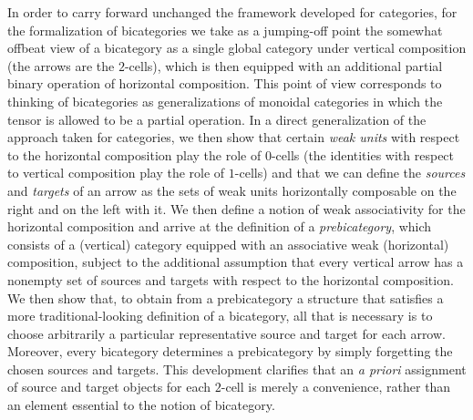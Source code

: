 \documentclass[11pt,notitlepage,a4paper]{report}
\begin{document}
In order to carry forward unchanged the framework developed for categories, for the
formalization of bicategories we take as a jumping-off point the somewhat offbeat view of
a bicategory as a single global category under vertical composition (the arrows are
the $2$-cells), which is then equipped with an additional partial binary operation of
horizontal composition.  This point of view corresponds to thinking of bicategories as
generalizations of monoidal categories in which the tensor is allowed to be a partial
operation.  In a direct generalization of the approach taken for categories,
we then show that certain \emph{weak units} with respect to the horizontal composition play
the role of $0$-cells (the identities with respect to vertical composition play the role
of $1$-cells) and that we can define the \emph{sources} and \emph{targets} of an arrow
as the sets of weak units horizontally composable on the right and on the left with it.
We then define a notion of weak associativity for the horizontal composition and arrive
at the definition of a \emph{prebicategory}, which consists of a (vertical) category equipped
with an associative weak (horizontal) composition, subject to the additional assumption
that every vertical arrow has a nonempty set of sources and targets with respect to
the horizontal composition.
We then show that, to obtain from a prebicategory a structure that satisfies a more
traditional-looking definition of a bicategory, all that is necessary is to choose
arbitrarily a particular representative source and target for each arrow.
Moreover, every bicategory determines a prebicategory by simply forgetting the chosen
sources and targets.
This development clarifies that an \emph{a priori} assignment of source and target objects
for each $2$-cell is merely a convenience, rather than an element essential to the notion
of bicategory.
\end{document}
